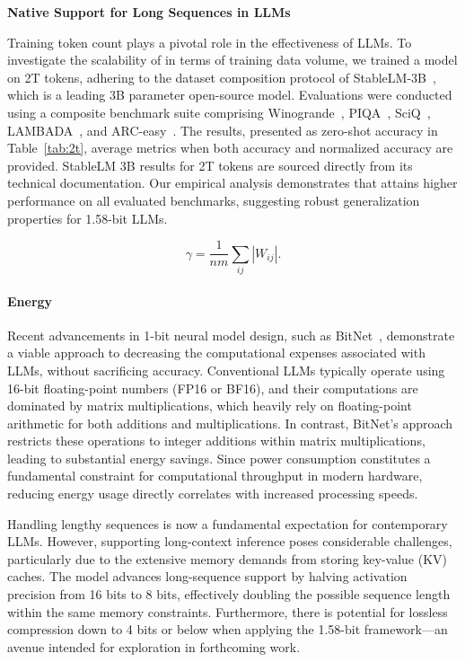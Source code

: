 \textbf{Native Support for Long Sequences in LLMs}

Training token count plays a pivotal role in the effectiveness of LLMs. To investigate the scalability of  in terms of training data volume, we trained a  model on 2T tokens, adhering to the dataset composition protocol of StableLM-3B~\cite{StableLM-3B-4E1T}, which is a leading 3B parameter open-source model. Evaluations were conducted using a composite benchmark suite comprising Winogrande~\cite{winoGrande}, PIQA~\cite{piqa}, SciQ~\cite{sciq}, LAMBADA~\cite{lambada}, and ARC-easy~\cite{arc}. The results, presented as zero-shot accuracy in Table~\ref{tab:2t}, average metrics when both accuracy and normalized accuracy are provided. StableLM 3B results for 2T tokens are sourced directly from its technical documentation. Our empirical analysis demonstrates that  attains higher performance on all evaluated benchmarks, suggesting robust generalization properties for 1.58-bit LLMs.

\begin{equation}
    \gamma = \frac{1}{nm}\sum_{ij} |W_{ij}|.
\end{equation}

\paragraph{Energy}

Recent advancements in 1-bit neural model design, such as BitNet~\cite{bitnet}, demonstrate a viable approach to decreasing the computational expenses associated with LLMs, without sacrificing accuracy. Conventional LLMs typically operate using 16-bit floating-point numbers (FP16 or BF16), and their computations are dominated by matrix multiplications, which heavily rely on floating-point arithmetic for both additions and multiplications. In contrast, BitNet’s approach restricts these operations to integer additions within matrix multiplications, leading to substantial energy savings. Since power consumption constitutes a fundamental constraint for computational throughput in modern hardware, reducing energy usage directly correlates with increased processing speeds.

Handling lengthy sequences is now a fundamental expectation for contemporary LLMs. However, supporting long-context inference poses considerable challenges, particularly due to the extensive memory demands from storing key-value (KV) caches. The  model advances long-sequence support by halving activation precision from 16 bits to 8 bits, effectively doubling the possible sequence length within the same memory constraints. Furthermore, there is potential for lossless compression down to 4 bits or below when applying the 1.58-bit framework—an avenue intended for exploration in forthcoming work.


